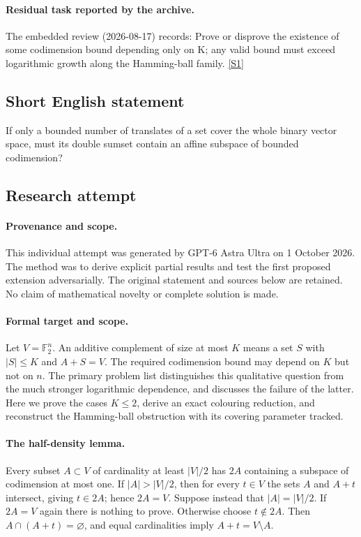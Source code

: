 \documentclass[11pt,a4paper]{article}
\newcommand{\F}{\mathbb{F}}
\newcommand{\sref}[2]{\hyperlink{source:#1:#2}{[S#2]}}
\begin{document}
\paragraph{Residual task reported by the archive.}

The embedded review (2026-08-17) records: Prove or disprove the existence of some codimension bound depending only on K; any valid bound must exceed logarithmic growth along the Hamming-ball family. \sref{113}{1}

\subsection{Short English statement}

If only a bounded number of translates of a set cover the whole binary vector space, must its double sumset contain an affine subspace of bounded codimension?

\subsection{Research attempt}

\paragraph{Provenance and scope.}
This individual attempt was generated by GPT-6 Astra Ultra on 1 October 2026. The method was to derive explicit partial results and test the first proposed extension adversarially. The original statement and sources below are retained. No claim of mathematical novelty or complete solution is made.

\paragraph{Formal target and scope.}
Let $V=\F_2^n$. An additive complement of size at most $K$ means a set $S$ with $|S|\leq K$ and $A+S=V$. The required codimension bound may depend on $K$ but not on $n$. The primary problem list distinguishes this qualitative question from the much stronger logarithmic dependence, and discusses the failure of the latter. Here we prove the cases $K\leq2$, derive an exact colouring reduction, and reconstruct the Hamming-ball obstruction with its covering parameter tracked.

\paragraph{The half-density lemma.}
Every subset $A\subset V$ of cardinality at least $|V|/2$ has $2A$ containing a subspace of codimension at most one. If $|A|>|V|/2$, then for every $t\in V$ the sets $A$ and $A+t$ intersect, giving $t\in2A$; hence $2A=V$. Suppose instead that $|A|=|V|/2$. If $2A=V$ again there is nothing to prove. Otherwise choose $t\notin2A$. Then $A\cap(A+t)=\varnothing$, and equal cardinalities imply $A+t=V\setminus A$.
\end{document}
